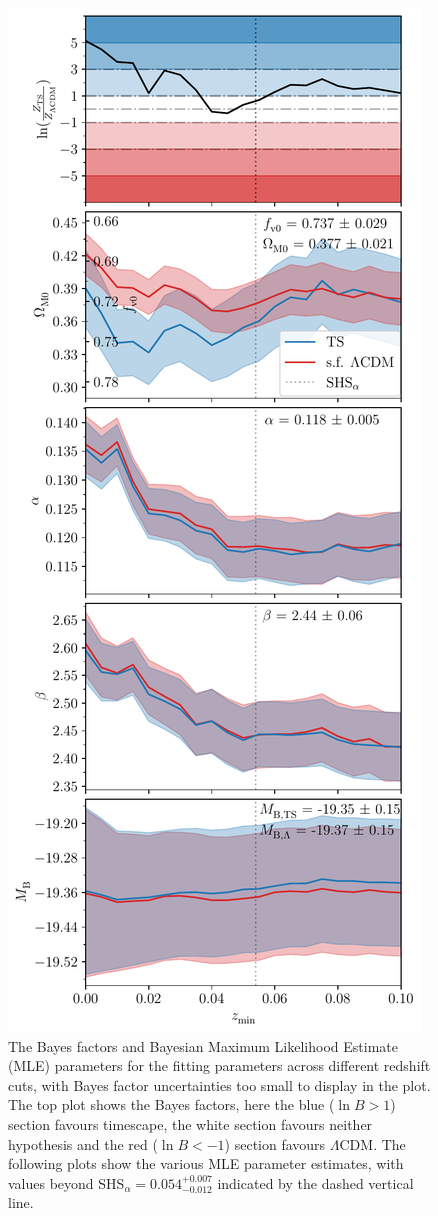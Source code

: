 \documentclass[fleqn,usenatbib]{mnras}
\newcommand{\LA}{\Lambda}
\newcommand{\LCDM}{$\LA$CDM}
\begin{document}
\begin{figure}
    \includegraphics[width=\columnwidth]{images/multiple_plot_tripp.pdf}
    \caption{The Bayes factors and Bayesian Maximum Likelihood Estimate (MLE) parameters for the fitting parameters across different redshift cuts, with Bayes factor uncertainties too small to display in the plot. The top plot shows the Bayes factors, here the blue ($\ln B > 1$) section favours timescape, the white section favours neither hypothesis and the red ($\ln B < -1$) section favours \LCDM. The following plots show the various MLE parameter estimates, with values beyond SHS$_\alpha = 0.054^{+0.007}_{-0.012}$ indicated by the dashed vertical line.}
    \label{fig:results}
\end{figure}
\end{document}
